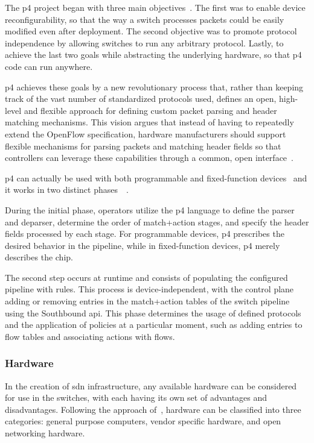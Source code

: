 The \gls{p4} project began with three main objectives~\cite{bosshart_p4_2014}. The first was to enable device reconfigurability, so that the way a switch processes packets could be easily modified even after deployment. The second objective was to promote protocol independence by allowing switches to run any arbitrary protocol. Lastly, to achieve the last two goals while abstracting the underlying hardware, so that \gls{p4} code can run anywhere. 

\gls{p4} achieves these goals by a new revolutionary process that, rather than keeping track of the vast number of standardized protocols used, defines an open, high-level and flexible approach for defining custom packet parsing and header matching mechanisms. This vision argues that instead of having to repeatedly extend the OpenFlow specification, hardware manufacturers should support flexible mechanisms for parsing packets and matching header fields so that controllers can leverage these capabilities through a common, open interface~\cite{bosshart_p4_2014}. 

\gls{p4} can actually be used with both programmable and fixed-function devices~\cite{peterson_software-defined_2021} and it works in two distinct phases~\cite{bosshart_p4_2014}~\cite{bifulco_survey_2018}. 

During the initial phase, operators utilize the \gls{p4} language to define the parser and deparser, determine the order of match+action stages, and specify the header fields processed by each stage. For programmable devices, \gls{p4} prescribes the desired behavior in the pipeline, while in fixed-function devices, \gls{p4} merely describes the chip. 

The second step occurs at runtime and consists of populating the configured pipeline with rules. This process is device-independent, with the control plane adding or removing entries in the match+action tables of the switch pipeline using the Southbound \gls{api}. This phase determines the usage of defined protocols and the application of policies at a particular moment, such as adding entries to flow tables and associating actions with flows.

\subsubsection{Hardware}
In the creation of \gls{sdn} infrastructure, any available hardware can be considered for use in the switches, with each having its own set of advantages and disadvantages. Following the approach of~\cite{xia_survey_2015}, hardware can be classified into three categories: general purpose computers, vendor specific hardware, and open networking hardware. 

